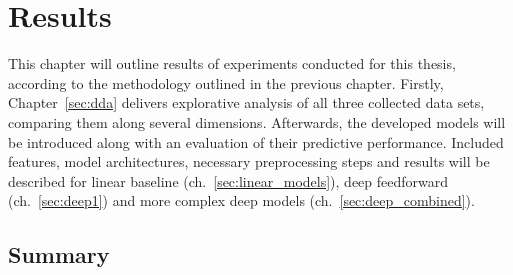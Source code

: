 \section{Results}
\label{ch:results}

This chapter will outline results of experiments conducted for this thesis,
according to the methodology outlined in the previous chapter.
Firstly, Chapter~\ref{sec:dda} delivers explorative analysis of all three
collected data sets, comparing them along several dimensions.
Afterwards, the developed models will be introduced along with an evaluation
of their predictive performance.
Included features, model architectures, necessary preprocessing steps and results will
be described for linear baseline (ch.~\ref{sec:linear_models}),
deep feedforward (ch.~\ref{sec:deep1}) and more complex deep models
(ch.~\ref{sec:deep_combined}).









\subsection{Summary}
\label{sec:res_summary}

